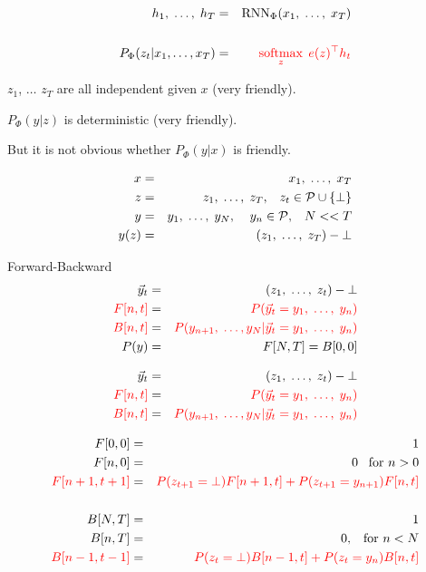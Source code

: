 {\begin{eqnarray*}
  h_1,\;\ldots,\;h_T & = & \mathrm{RNN}_\Phi(x_1,\;\ldots,\;x_T) \\
  \\
  P_\Phi(z_t|x_1,\ldots,x_T) & = & {\color{red} \operatorname*{softmax}_{z} \;e(z)^\top h_t}
\end{eqnarray*}

\vfill
$z_1$, $\ldots$ $z_T$ are {\color{red}  all independent} given $x$ (very friendly).

\vfill
$P_\Phi(y|z)$ is {\color{red} deterministic} (very friendly).

\vfill
{\color{red} But it is not obvious whether $P_\Phi(y|x)$ is friendly.}


\begin{eqnarray*}
  x & = & x_1,\;\ldots,\; x_T \\
  z & = & z_1, \;\ldots,\;z_T,\;\;\;z_t \in {\cal P}\cup \{\bot\} \\
  y & = & y_1,\;\ldots,\;y_N,\;\;\;\;y_n \in {\cal P},\;\;\;N << T \\
  y(z) & = & (z_1,\;\ldots,\;z_T) - \bot
\end{eqnarray*}

\vfill

Forward-Backward
\begin{eqnarray*}
  \vec{y}_t & = & (z_1,\;\ldots,\;z_t)-\bot \\
  {\color{red} F[n,t]} & = & {\color{red} P(\vec{y}_t = y_1,\;\ldots,\;y_n)} \\
  {\color{red} B[n,t]} & = & {\color{red} P(y_{n+1},\;\ldots,y_N | \vec{y}_t = y_1,\;\ldots,\;y_n)} \\
  P(y) & = & F[N,T] = B[0,0]
\end{eqnarray*}




\begin{eqnarray*}
  \vec{y}_t & = & (z_1,\;\ldots,\;z_t)-\bot \\
  {\color{red} F[n,t]} & = & {\color{red} P(\vec{y}_t = y_1,\;\ldots,\;y_n)} \\
  {\color{red} B[n,t]} & = & {\color{red} P(y_{n+1},\;\ldots,y_N | \vec{y}_t = y_1,\;\ldots,\;y_n)}
\end{eqnarray*}

\begin{eqnarray*}
  F[0,0] & = & 1 \\
  F[n,0] & = & 0 \;\;\;\mbox{for $n > 0$} \\
  {\color{red} F[n+1,t+1]} & = & {\color{red} P(z_{t+1} = \bot) F[n+1,t] + P(z_{t+1} = y_{n+1})F[n,t]} \\
  \\
  B[N,T] & = & 1 \\
  B[n,T] & = & 0,\;\;\;\mbox{for $n < N$} \\
  {\color{red} B[n-1,t-1]} & = & {\color{red} P(z_t = \bot)B[n-1,t] +  P(z_t = y_n)B[n,t]}
\end{eqnarray*}

}
